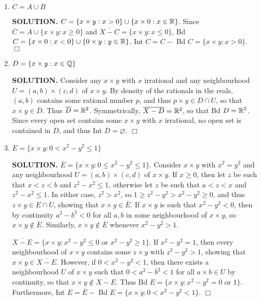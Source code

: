 \documentclass{article}
\begin{document}
\begin{enumerate}
\begin{enumerate}
            {\bf SOLUTION.} $B = (0, \infty) \times (-\infty, 0) \cup (0, \infty) \times (0, \infty)$ is clearly open, so Bd $B = \overline{B} - B$. $\overline{B} = \{x \times y: x > 0\}$, so Bd $B = \{x \times y: x > 0, y = 0\}$. Moreover, Int $B = B$. $\Box$

            \item $C = A \cup B$

            {\bf SOLUTION.} $C = \{x \times y: x>0\} \cup \{x \times 0: x \in \mathbb{R}\}$. Since $\overline{C} = A \cup \{x \times y: x \geq 0\}$ and $\overline{X - C} = \{x \times y: x \leq 0\}$, Bd $C = \{x \times 0:x < 0\} \cup \{0 \times y: y\in \mathbb{R}\}$. Int $C = \overline{C} - $ Bd $C = \{x \times y: x > 0\}$. $\Box$

            \item $D = \{x \times y: x \in \mathbb{Q}\}$

            {\bf SOLUTION.} Consider any $x \times y$ with $x$ irrational and any neighbourhood $U = (a, b) \times (c,d)$ of $x \times y$. By density of the rationals in the reals, $(a, b)$ contains some rational number $p$, and thus $p \times y \in D \cap U$, so that $x \times y \in \overline{D}.$ Thus $\overline{D} = \mathbb{R}^2$. Symmetrically, $\overline{X-D} = \mathbb{R}^2$, so that Bd $D = \mathbb{R}^2$. Since every open set contains some $x \times y$ with $x$ irrational, no open set is contained in $D$, and thus Int $D = \varnothing.$ $\Box$
                        
            \item $E = \{x \times y: 0 < x^2-y^2 \leq 1\}$

            {\bf SOLUTION.} $\overline{E} = \{x\times y: 0 \leq x^2-y^2 \leq 1\}$. Consider $x\times y$ with $x^2=y^2$ and any neighbourhood $U = (a,b) \times (c,d)$ of $x \times y$. If $x \geq 0$, then let $z$ be such that $x < z < b$ and $z^2-x^2 \leq 1$, otherwise let $z$ be such that $a < z< x$ and $z^2-x^2 \leq 1$. In either case, $z^2 > x^2$, so $1 \geq z^2-y^2 > x^2-y^2 \geq 0$, and thus $z \times y \in E \cap U$, showing that $x \times y \in \overline{E}$. If $x \times y$ is such that $x^2-y^2 < 0$, then by continuity $a^2 - b^2 < 0$ for all $a, b$ in some neighbourhood of $x \times y$, so $x \times y \notin \overline{E}$. Similarly, $x \times y \notin \overline{E}$ whenever $x^2-y^2 > 1$.

            $\overline{X-E} = \{x \times y: x^2-y^2 \leq 0 \text{ or } x^2 - y^2 \geq 1\}$. If $x^2 - y^2 = 1$, then every neighbourhood of $x \times y$ contains some $z \times y$ with $z^2-y^2 > 1$, showing that $x \times y \in \overline{X-E}$. However, if $0 < x^2-y^2 < 1$, then there exists a neighbourhood $U$ of $x \times y$ such that $0 < a^2-b^2 < 1$ for all $a\times b\in U$ by continuity, so that $x \times y \notin \overline{X-E}.$ Thus Bd $E = \{x\times y: x^2 -y^2 = 0 \text{ or } 1\}$. Furthermore, Int $E = \overline{E} -$ Bd $E = \{x \times y: 0<x^2 - y^2<1\}$. $\Box$
            

\end{enumerate}
\end{enumerate}
\end{document}
